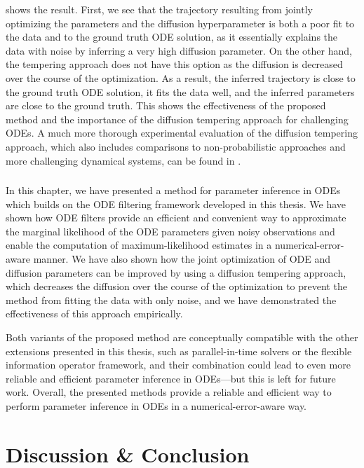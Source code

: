 \documentclass{mimosis}
\begin{document}
 shows the result.
First, we see that the trajectory resulting from jointly optimizing the parameters and the diffusion hyperparameter is both a poor fit to the data and to the ground truth ODE solution, as it essentially explains the data with noise by inferring a very high diffusion parameter.
On the other hand, the tempering approach does not have this option as the diffusion is decreased over the course of the optimization.
As a result, the inferred trajectory is close to the ground truth ODE solution, it fits the data well, and the inferred parameters are close to the ground truth.
This shows the effectiveness of the proposed method and the importance of the diffusion tempering approach for challenging ODEs.
A much more thorough experimental evaluation of the diffusion tempering approach, which also includes comparisons to non-probabilistic approaches and more challenging dynamical systems, can be found in
\tempering{}.
\section{\wrapupsec{}}
\label{sec:orgad9d501}
In this chapter, we have presented a method for parameter inference in ODEs which builds on the ODE filtering framework developed in this thesis.
We have shown how ODE filters provide an efficient and convenient way to approximate the marginal likelihood of the ODE parameters given noisy observations and enable the computation of maximum-likelihood estimates in a numerical-error-aware manner.
We have also shown how the joint optimization of ODE and diffusion parameters can be improved by using a diffusion tempering approach, which decreases the diffusion over the course of the optimization to prevent the method from fitting the data with only noise, and we have demonstrated the effectiveness of this approach empirically.

Both variants of the proposed method are conceptually compatible with the other extensions presented in this thesis, such as parallel-in-time solvers or the flexible information operator framework, and their combination could lead to even more reliable and efficient parameter inference in ODEs---but this is left for future work.
Overall, the presented methods provide a reliable and efficient way to perform parameter inference in ODEs in a numerical-error-aware way.
\part{Discussion \& Conclusion}
\label{part:conclusion}
\end{document}

